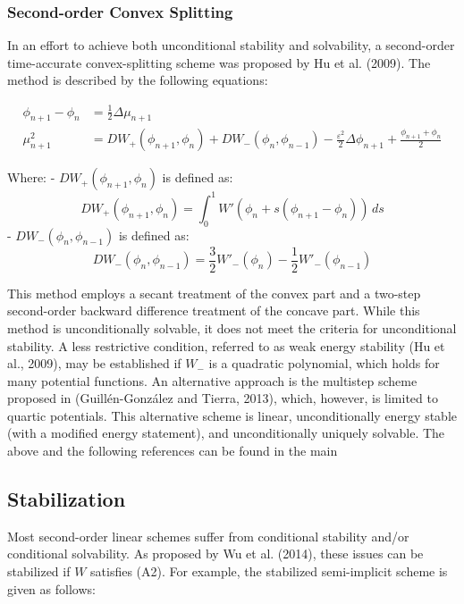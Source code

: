 \documentclass{article}
\begin{document}
\subsubsection{Second-order Convex Splitting} 

In an effort to achieve both unconditional stability and solvability, a second-order time-accurate convex-splitting scheme was proposed by Hu et al. (2009). The method is described by the following equations:

\begin{align}
\phi_{n+1} - \phi_n &= \frac{1}{2}\Delta\mu_{n+1} \tag{234} \\
\mu_{n+1}^{2} &= DW_{+}(\phi_{n+1}, \phi_n) + DW_{-}(\phi_n, \phi_{n-1}) - \frac{\varepsilon^2}{2}\Delta\phi_{n+1} + \frac{\phi_{n+1} + \phi_n}{2} \tag{78}
\end{align}

Where:
- \(DW_{+}(\phi_{n+1}, \phi_n)\) is defined as:
\begin{equation}
DW_{+}(\phi_{n+1}, \phi_n) = \int_{0}^{1} W'(\phi_n + s(\phi_{n+1} - \phi_n)) \, ds \tag{79}
\end{equation}
- \(DW_{-}(\phi_n, \phi_{n-1})\) is defined as:
\begin{equation}
DW_{-}(\phi_n, \phi_{n-1}) = \frac{3}{2}W'_{-}(\phi_n) - \frac{1}{2}W'_{-}(\phi_{n-1}) \tag{80}
\end{equation}

This method employs a secant treatment of the convex part and a two-step second-order backward difference treatment of the concave part. While this method is unconditionally solvable, it does not meet the criteria for unconditional stability. A less restrictive condition, referred to as weak energy stability (Hu et al., 2009), may be established if \(W_{-}\) is a quadratic polynomial, which holds for many potential functions. An alternative approach is the multistep scheme proposed in (Guillén-González and Tierra, 2013), which, however, is limited to quartic potentials. This alternative scheme is linear, unconditionally energy stable (with a modified energy statement), and unconditionally uniquely solvable. The above and the following references can be found in the main \cite{inbook}
\subsection{Stabilization}
Most second-order linear schemes suffer from conditional stability and/or conditional solvability. As proposed by Wu et al. (2014), these issues can be stabilized if $W$ satisfies (A2). For example, the stabilized semi-implicit scheme is given as follows:
\end{document}
